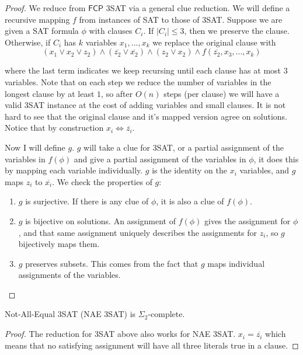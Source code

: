 \documentclass[runningheads,a4paper]{llncs}
\begin{document}
\begin{proof}
We reduce from $\mathsf{FCP}$ 3SAT via a general clue reduction. We will define a recursive mapping $f$ from instances of SAT to those of 3SAT. Suppose we are given a SAT formula $\phi$ with clauses $C_i$. If $|C_i| \leq 3$, then we preserve the clause. Otherwise, if $C_i$ has $k$ variables $x_1,...,x_k$ we replace the original clause with 
\[ 
(x_1 \vee x_2 \vee z_2) \wedge (\overline{z_2} \vee \overline{x_2}) \wedge (z_2 \vee x_2) \wedge f(\overline{z_2}, x_3, ..., x_k) 
\]

where the last term indicates we keep recursing until each clause has at most $3$ variables. Note that on each step we reduce the number of variables in the longest clause by at least $1$, so after $O(n)$ steps (per clause) we will have a valid 3SAT instance at the cost of adding variables and small clauses. It is not hard to see that the original clause and it's mapped version agree on solutions. Notice that by construction $x_i \iff \overline{z_i}$. 

Now I will define $g$. $g$ will take a clue for 3SAT, or a partial assignment of the variables in $f(\phi)$ and give a partial assignment of the variables in $\phi$, it does this by mapping each variable individually. $g$ is the identity on the $x_i$ variables, and $g$ maps $z_i$ to $\overline{x_i}$. We check the properties of $g$:
\begin{enumerate}
\item $g$ is surjective. If there is any clue of $\phi$, it is also a clue of $f(\phi)$. 
\item $g$ is bijective on solutions. An assignment of $f(\phi)$ gives the assignment for $\phi$, and that same assignment uniquely describes the assignments for $z_i$, so $g$ bijectively maps them.
\item $g$ preserves subsets. This comes from the fact that $g$ maps individual assignments of the variables. 
\end{enumerate}
\end{proof}

\begin{corollary}
Not-All-Equal 3SAT (NAE 3SAT) is $\Sigma_2$-complete.
\end{corollary}

\begin{proof}
The reduction for 3SAT above also works for NAE 3SAT. $x_i = \overline{z_i}$ which means that no satisfying assignment will have all three literals true in a clause. 
\end{proof}
\end{document}
